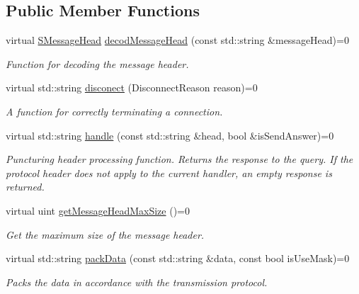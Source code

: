 \subsection*{Public Member Functions}
\begin{DoxyCompactItemize}
\item 
virtual \mbox{\hyperlink{struct_net_1_1_s_message_head}{S\+Message\+Head}} \mbox{\hyperlink{class_net_1_1_c_net_handler_a992b6c07fcda7c7f8ee411773b7dc3c6}{decod\+Message\+Head}} (const std\+::string \&message\+Head)=0
\begin{DoxyCompactList}\small\item\em Function for decoding the message header. \end{DoxyCompactList}\item 
virtual std\+::string \mbox{\hyperlink{class_net_1_1_c_net_handler_a1f43099b8631032d4555a326dd71f4d1}{disconect}} (Disconnect\+Reason reason)=0
\begin{DoxyCompactList}\small\item\em A function for correctly terminating a connection. \end{DoxyCompactList}\item 
virtual std\+::string \mbox{\hyperlink{class_net_1_1_c_net_handler_a7bd761afe7eff3897b840db84f870135}{handle}} (const std\+::string \&head, bool \&is\+Send\+Answer)=0
\begin{DoxyCompactList}\small\item\em Puncturing header processing function. Returns the response to the query. If the protocol header does not apply to the current handler, an empty response is returned. \end{DoxyCompactList}\item 
virtual uint \mbox{\hyperlink{class_net_1_1_c_net_handler_a6d0a79a8fc8126f6bf90e348c90152a7}{get\+Message\+Head\+Max\+Size}} ()=0
\begin{DoxyCompactList}\small\item\em Get the maximum size of the message header. \end{DoxyCompactList}\item 
virtual std\+::string \mbox{\hyperlink{class_net_1_1_c_net_handler_a9e8b6b44b05d2acb7b7cb28c57bedcb8}{pack\+Data}} (const std\+::string \&data, const bool is\+Use\+Mask)=0
\begin{DoxyCompactList}\small\item\em Packs the data in accordance with the transmission protocol. \end{DoxyCompactList}\item 

\end{DoxyCompactItemize}
